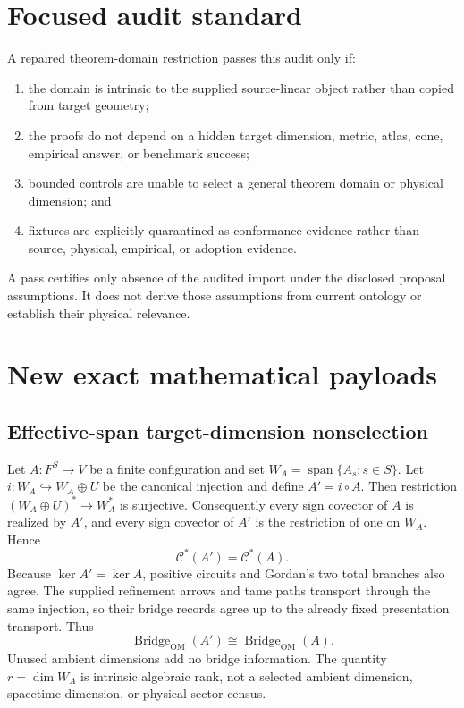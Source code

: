 \documentclass[11pt]{article}
\newcommand{\Bridge}{\operatorname{Bridge}_{\mathrm{OM}}}
\newcommand{\Cstar}{\mathcal{C}^{*}}
\begin{document}
\section{Focused audit standard}

A repaired theorem-domain restriction passes this audit only if:
\begin{enumerate}[leftmargin=*]
  \item the domain is intrinsic to the supplied source-linear object rather
  than copied from target geometry;
  \item the proofs do not depend on a hidden target dimension, metric, atlas,
  cone, empirical answer, or benchmark success;
  \item bounded controls are unable to select a general theorem domain or
  physical dimension; and
  \item fixtures are explicitly quarantined as conformance evidence rather
  than source, physical, empirical, or adoption evidence.
\end{enumerate}
A pass certifies only absence of the audited import under the disclosed
proposal assumptions.  It does not derive those assumptions from current
ontology or establish their physical relevance.

\section{New exact mathematical payloads}

\subsection{Effective-span target-dimension nonselection}

Let $A:F^S\to V$ be a finite configuration and set
$W_A=\operatorname{span}\{A_s:s\in S\}$.  Let
$i:W_A\hookrightarrow W_A\oplus U$ be the canonical injection and define
$A'=i\circ A$.  Then restriction
$(W_A\oplus U)^*\to W_A^*$ is surjective.  Consequently every sign covector
of $A$ is realized by $A'$, and every sign covector of $A'$ is the restriction
of one on $W_A$.  Hence
\[
 \Cstar(A')=\Cstar(A).
\]
Because $\ker A'=\ker A$, positive circuits and Gordan's two total branches
also agree.  The supplied refinement arrows and tame paths transport through
the same injection, so their bridge records agree up to the already fixed
presentation transport.  Thus
\[
 \Bridge(A')\cong\Bridge(A).
\]
Unused ambient dimensions add no bridge information.  The quantity
$r=\dim W_A$ is intrinsic algebraic rank, not a selected ambient dimension,
spacetime dimension, or physical sector census.
\end{document}
